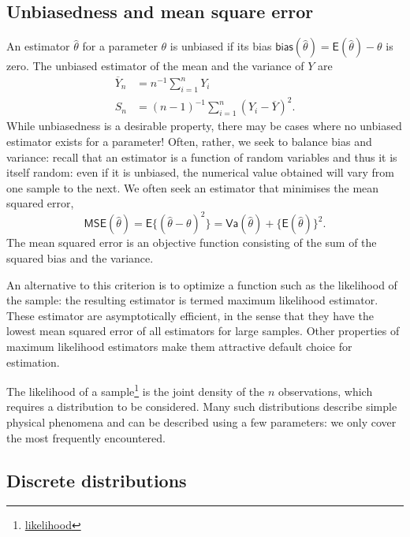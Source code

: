 \documentclass[
  11pt,
  letterpaper,
]{book}
\renewcommand{\href}[2]{#2\footnote{\url{#1}}}
\theoremstyle{definition}
\theoremstyle{definition}
\theoremstyle{definition}
\theoremstyle{remark}
\begin{document}
\hypertarget{unbiasedness-and-mean-square-error}{%
\subsection{Unbiasedness and mean square error}\label{unbiasedness-and-mean-square-error}}

An estimator \(\hat{\theta}\) for a parameter \(\theta\) is unbiased if its bias \(\mathsf{bias}(\hat{\theta})=\mathsf{E}(\hat{\theta})- \theta\) is zero.
The unbiased estimator of the mean and the variance of \(Y\) are
\begin{align*}
\overline{Y}_n &= n^{-1} \sum_{i=1}^n Y_i\\
S_n &= (n-1)^{-1} \sum_{i=1}^n (Y_i-\overline{Y})^2.
\end{align*}
While unbiasedness is a desirable property, there may be cases where no unbiased estimator exists for a parameter! Often, rather, we seek to balance bias and variance: recall that an estimator is a function of random variables and thus it is itself random: even if it is unbiased, the numerical value obtained will vary from one sample to the next. We often seek an estimator that minimises the mean squared error, \[\mathsf{MSE}(\hat{\theta}) = \mathsf{E}\{(\hat{\theta}-\theta)^2\}=\mathsf{Va}(\hat{\theta}) + \{\mathsf{E}(\hat{\theta})\}^2.\]
The mean squared error is an objective function consisting of the sum of the squared bias and the variance.

An alternative to this criterion is to optimize a function such as the likelihood of the sample: the resulting estimator is termed maximum likelihood estimator. These estimator are asymptotically efficient, in the sense that they have the lowest mean squared error of all estimators for large samples. Other properties of maximum likelihood estimators make them attractive default choice for estimation.

The \href{likelihood}{likelihood of a sample} is the joint density of the \(n\) observations, which requires a distribution to be considered. Many such distributions describe simple physical phenomena and can be described using a few parameters: we only cover the most frequently encountered.

\hypertarget{discrete-distributions}{%
\subsection{Discrete distributions}\label{discrete-distributions}}
\end{document}
